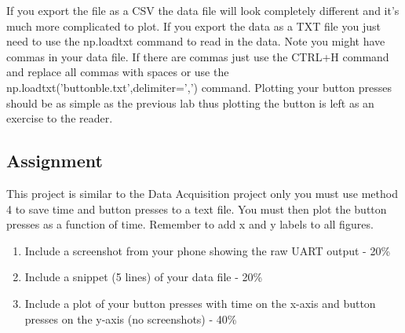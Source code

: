 If you export the file as a CSV the data file will look completely
different and it's much more complicated to plot. If you export the
data as a TXT file you just need to use the np.loadtxt command to read
in the data. Note you might have commas in your data file. If there
are commas just use the CTRL+H command and replace all commas with
spaces or use the np.loadtxt('buttonble.txt',delimiter=',')
command. Plotting your button presses should be as simple as the
previous lab thus plotting the button is left as an exercise to the
reader. 

\subsection{Assignment}

This project is similar to the Data Acquisition project only you must use method 4 to save time and button presses to a text file. You must then plot the button presses as a function of time. Remember to add x and y labels to all figures.



\begin{enumerate}[itemsep=-5pt]
\item Include a screenshot from your phone showing the raw UART output - 20\%
\item Include a snippet (5 lines) of your data file - 20\%
\item Include a plot of your button presses with time on the x-axis and button presses on the y-axis (no screenshots) - 40\%
\end{enumerate}
